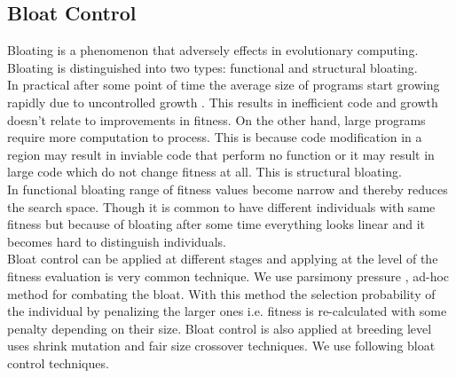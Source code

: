 \documentclass{acm_proc_article-sp}
\begin{document}
\subsection{Bloat Control}  \label{bloat}
Bloating \cite{PoliLM2008} is a phenomenon that adversely effects in evolutionary computing. Bloating is distinguished into two types: functional and structural bloating. \\
\indent In practical after some point of time the average size of programs start growing rapidly due to uncontrolled growth \cite{Soule96}. This results in inefficient code and growth doesn't relate to improvements in fitness. On the other hand, large programs require more computation to process. This is because code modification in a region may result in inviable code that perform no function or it may result in large code which do not change fitness at all. This is structural bloating.\\
\indent In functional bloating \cite{LangdonP98} range of fitness values become narrow and thereby reduces the search space. Though it is common to have different individuals with same fitness but because of bloating after some time everything looks linear and it becomes hard to distinguish individuals.\\
\indent Bloat control \cite{Luke06} can be applied at different stages and applying at the level of the fitness evaluation is very common technique. We use parsimony pressure \cite{SouleF98}, ad-hoc method for combating the bloat. With this method the selection probability of the individual by penalizing the larger ones i.e. fitness is re-calculated with some penalty depending on their size. Bloat control is also applied at breeding level uses shrink mutation and fair size crossover \cite{PoliLM2008} techniques. We use following bloat control techniques.
\end{document}
